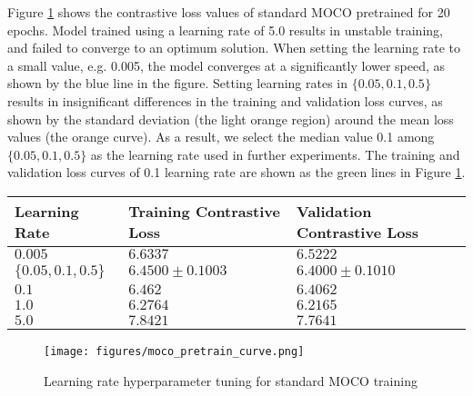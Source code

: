 \documentclass[12pt,twoside]{report}
\begin{document}
Figure \ref{fig:naiveMOCO_pretrain_curve} shows the contrastive loss values of standard MOCO pretrained for 20 epochs. Model trained using a learning rate of 5.0 results in unstable training, and failed to converge to an optimum solution. When setting the learning rate to a small value, e.g. 0.005, the model converges at a significantly lower speed, as shown by the blue line in the figure. Setting learning rates in $\{0.05, 0.1, 0.5\}$ results in insignificant differences in the training and validation loss curves, as shown by the standard deviation (the light orange region) around the mean loss values (the orange curve). As a result, we select the median value 0.1 among $\{0.05, 0.1, 0.5\}$ as the learning rate used in further experiments. The training and validation loss curves of 0.1 learning rate are shown as the green lines in Figure \ref{fig:naiveMOCO_pretrain_curve}. \\

\begin{table}[]
    \centering
    \begin{tabular}{lll}
    \toprule
    Learning Rate & Training Contrastive Loss & Validation Contrastive Loss \\
    \midrule
    $0.005$ & $6.6337$ & $6.5222$ \\
    $\{0.05, 0.1, 0.5 \}$ & $6.4500 \pm 0.1003$ & $6.4000 \pm 0.1010 $ \\
    $0.1$ & $6.462$ & $6.4062$ \\
    $1.0$ & $6.2764$ & $6.2165$ \\
    $5.0$ & $7.8421$ & $7.7641$ \\
    \bottomrule
    \end{tabular}
    \captionsetup{type=table}
    \label{tab:naive_moco_tuning}
\end{table}

\begin{figure}
    \centering
    \texttt{[image: figures/moco\_pretrain\_curve.png]}
    \caption{Learning rate hyperparameter tuning for standard MOCO training}
    \label{fig:naiveMOCO_pretrain_curve}
\end{figure}
\end{document}

